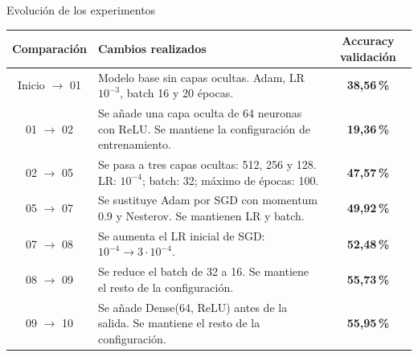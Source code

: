 \documentclass{beamer}
\begin{document}
\begin{frame}{Evolución de los experimentos}
    \scriptsize
    \setlength{\tabcolsep}{4pt}
    \renewcommand{\arraystretch}{1.35}

    \begin{tabularx}{\textwidth}{@{}c X c@{}}
        \toprule
        \textbf{Comparación} &
        \textbf{Cambios realizados} &
        \textbf{Accuracy validación} \\
        \midrule

        Inicio $\to$ 01
        & Modelo base sin capas ocultas.
          Adam, LR $10^{-3}$, batch 16 y 20 épocas.
        & \textbf{38,56\,\%} \\

        01 $\to$ 02
        & Se añade una capa oculta de 64 neuronas con ReLU.
          Se mantiene la configuración de entrenamiento.
        & \textbf{19,36\,\%} \\

        02 $\to$ 05
        & Se pasa a tres capas ocultas: 512, 256 y 128.
          LR: $10^{-4}$; batch: 32;
          máximo de épocas: 100.
        & \textbf{47,57\,\%} \\

        05 $\to$ 07
        & Se sustituye Adam por SGD con momentum 0.9
          y Nesterov. Se mantienen LR y batch.
        & \textbf{49,92\,\%} \\

        07 $\to$ 08
        & Se aumenta el LR inicial de SGD:
          $10^{-4} \to 3\cdot10^{-4}$.
        & \textbf{52,48\,\%} \\

        08 $\to$ 09
        & Se reduce el batch de 32 a 16.
          Se mantiene el resto de la configuración.
        & \textbf{55,73\,\%} \\

        09 $\to$ 10
        & Se añade Dense(64, ReLU) antes de la salida.
          Se mantiene el resto de la configuración.
        & \textbf{55,95\,\%} \\

        \bottomrule
    \end{tabularx}

\end{frame}
\end{document}
